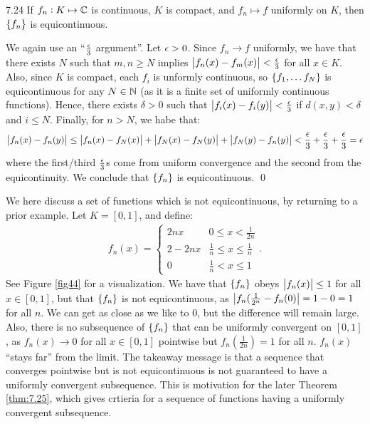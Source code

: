 \begin{theorem}{}{7.24}
    If $f_n: K \mapsto \mathbb{C}$ is continuous, $K$ is compact, and $f_n \mapsto f$ uniformly on $K$, then $\set{f_n}$ is equicontinuous.
\end{theorem}
\begin{nproof}
    We again use an ``$\frac{\epsilon}{3}$ argument''. Let $\epsilon > 0$. Since $f_n \rightarrow f$ uniformly, we have that there exists $N$ such that $m, n \geq N$ implies $\abs{f_n(x) - f_m(x)} < \frac{\epsilon}{3}$ for all $x \in K$. Also, since $K$ is compact, each $f_i$ is unformly continuous, so $\set{f_1, \ldots f_N}$ is equicontinuous for any $N \in \mathbb{N}$ (as it is a finite set of uniformly continuous functions). Hence, there exists $\delta > 0$ such that $\abs{f_i(x) - f_i(y)} < \frac{\epsilon}{3}$ if $d(x, y) < \delta$ and $i \leq N$. Finally, for $n > N$, we habe that:
    \begin{align*}
        \abs{f_n(x) - f_n(y)} \leq \abs{f_n(x) - f_N(x)} + \abs{f_N(x) - f_N(y)} + \abs{f_N(y) - f_n(y)} < \frac{\epsilon}{3} + \frac{\epsilon}{3} + \frac{\epsilon}{3} = \epsilon
    \end{align*}
    where the first/third $\frac{\epsilon}{3}$s come from uniform convergence and the second from the equicontinuity. We conclude that $\set{f_n}$ is equicontinuous. \qed
\end{nproof}

\begin{nexample}{}{}
    We here discuss a set of functions which is not equicontinuous, by returning to a prior example. Let $K = [0, 1]$, and define:
    \begin{align*}
        f_n(x) = \begin{cases}
            2nx & 0 \leq x < \frac{1}{2n}
            \\ 2 - 2nx & \frac{1}{n} \leq x \leq \frac{1}{n}
            \\ 0 & \frac{1}{n} < x \leq 1
        \end{cases}.
    \end{align*}
    See Figure \ref{fig44} for a visualization. We have that $\set{f_n}$ obeys $\abs{f_n(x)} \leq 1$ for all $x \in [0, 1]$, but that $\set{f_n}$ is not equicontinuous, as $\abs{f_n(\frac{1}{2^n} - f_n(0)} = 1 - 0 = 1$ for all $n$. We can get as close as we like to $0$, but the difference will remain large. Also, there is no subsequence of $\set{f_n}$ that can be uniformly convergent on $[0, 1]$, as $f_n(x) \rightarrow 0$ for all $x \in [0, 1]$ pointwise but $f_n(\frac{1}{2n}) = 1$ for all $n$. $f_n(x)$ ``stays far'' from the limit. The takeaway message is that a sequence that converges pointwise but is not equicontinuous is not guaranteed to have a uniformly convergent subsequence. This is motivation for the later Theorem \ref{thm:7.25}, which gives crtieria for a sequence of functions having a uniformly convergent subsequence.
\end{nexample}

